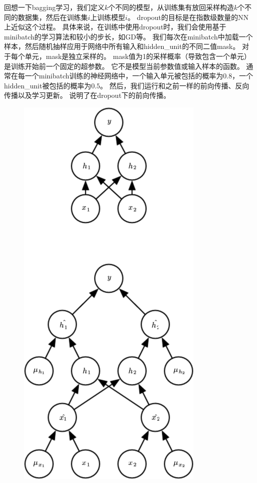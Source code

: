 
回想一下\gls{bagging}学习，我们定义$k$个不同的模型，从训练集有放回采样构造$k$个不同的数据集，然后在训练集$i$上训练模型$i$。
\gls{dropout}的目标是在指数级数量的\gls{NN}上近似这个过程。
具体来说，在训练中使用\gls{dropout}时，我们会使用基于\gls{minibatch}的学习算法和较小的步长，如\gls{GD}等。
我们每次在\gls{minibatch}中加载一个样本，然后随机抽样应用于网络中所有输入和\gls{hidden_unit}的不同二值\gls{mask}。
对于每个单元，\gls{mask}是独立采样的。
\gls{mask}值为1的采样概率（导致包含一个单元）是训练开始前一个固定的超参数。
它不是模型当前参数值或输入样本的函数。
通常在每一个\gls{minibatch}训练的神经网络中，一个输入单元被包括的概率为$0.8$，一个\gls{hidden_unit}被包括的概率为$0.5$。
然后，我们运行和之前一样的前向传播、反向传播以及学习更新。
说明了在\gls{dropout}下的前向传播。
\begin{figure}[!htb]
\ifOpenSource
\centerline{\includegraphics[scale=0.5]{images/60.png}}

\end{figure}
